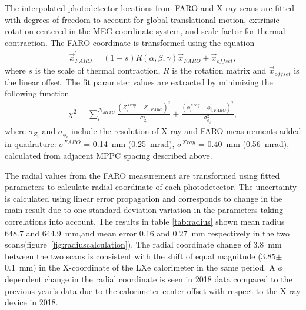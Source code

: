 The interpolated photodetector locations from FARO
and X-ray scans are fitted with degrees of freedom to account for
global translational motion, extrinsic rotation centered in the MEG
coordinate  system, and scale factor for thermal contraction. 
The FARO coordinate is transformed using the equation
\begin{align}
\vec{x}_{FARO}^{'} = (1-s)R(\alpha,\beta,\gamma)\vec{x}_{FARO} +
\vec{x}_{offset},  
\end{align}
where $s$ is the scale of thermal contraction, $R$ is the rotation
matrix  and $\vec{x}_{offset}$ is the linear offset. 
The fit parameter values are extracted by minimizing the following function
\begin {align}
\chi^2 = 
\sum\limits_{i}^{N_{MPPC}} \frac{(Z_{i}^{Xray}-Z_{i,FARO}^{'})^2}{\sigma_{Z_{i}}^2} 
+ 
\frac{(\phi_{i}^{Xray}-\phi_{i,FARO}^{'})^2}{\sigma_{\phi_i}^2},
\end{align}
where $\sigma_{Z_i}$ and $\sigma_{\phi_i}$ include the resolution
of X-ray and FARO measurements
added in quadrature: 
$\sigma^{FARO}$ = 0.14~mm (0.25~mrad), 
$\sigma^{Xray}$ = 0.40~mm (0.56~mrad),
calculated from adjacent MPPC spacing described above.


The radial values from the FARO measurement are transformed using
fitted parameters to calculate radial coordinate of each
photodetector.  The uncertainty is calculated using linear error
propagation and corresponds to change in the main result due to one
standard deviation variation in the parameters taking correlations
into account.  The results in table \ref{tab:radius} shown mean radius
648.7 and 644.9~mm,and mean error 0.16 and 0.27~mm respectively in the
two scans(figure~\ref{fig:radiuscalculation}).  The radial coordinate
change of 3.8~mm between the two scans is consistent with the shift of
equal magnitude (3.85$\pm$0.1~mm) in the X-coordinate of the LXe
calorimeter in the same period.  A $\phi$ dependent change in the
radial coordinate is seen in 2018 data compared to the previous year's
data due to the calorimeter center offset with respect to the X-ray
device in 2018.



